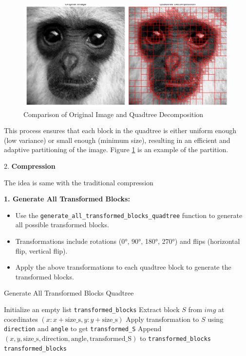 \documentclass[a4paper,11pt, titlepage]{article}
\theoremstyle{definition}
\theoremstyle{plain}
\theoremstyle{remark}
\theoremstyle{definition}
\begin{document}
\begin{figure}[ht]
    \centering
    \includegraphics[width=\textwidth]{quadtree_comparison.png}
    \caption{Comparison of Original Image and Quadtree Decomposition}
    \label{fig:quadtree_comparison}
\end{figure}

This process ensures that each block in the quadtree is either uniform enough (low variance) or small enough (minimum size), resulting in an efficient and adaptive partitioning of the image. Figure \ref{fig:quadtree_comparison} is an example of the partition.

2. \textbf{Compression}

The idea is same with the traditional compression
  
\textbf{1. Generate All Transformed Blocks:}
\begin{itemize}
    \item Use the \texttt{generate\_all\_transformed\_blocks\_quadtree} function to generate all possible transformed blocks.
    \item Transformations include rotations (0°, 90°, 180°, 270°) and flips (horizontal flip, vertical flip).
    \item Apply the above transformations to each quadtree block to generate the transformed blocks.
\end{itemize}

\begin{algorithm}
\caption{Generate All Transformed Blocks Quadtree}
\begin{algorithmic}[1]
\STATE Initialize an empty list \texttt{transformed\_blocks}
    \STATE Extract block $S$ from $img$ at coordinates $(x:x+\text{size\_s}, y:y+\text{size\_s})$
            \STATE Apply transformation to $S$ using \texttt{direction} and \texttt{angle} to get \texttt{transformed\_S}
            \STATE Append $(x, y, \text{size\_s}, \text{direction}, \text{angle}, \text{transformed\_S})$ to \texttt{transformed\_blocks}
        \ENDFOR
    \ENDFOR
\ENDFOR
\RETURN \texttt{transformed\_blocks}
\end{algorithmic}
\end{algorithm}
\end{document}
